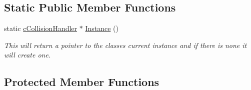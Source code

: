 \subsection*{Static Public Member Functions}
\begin{DoxyCompactItemize}
\item 
static \hyperlink{classc_collision_handler}{cCollisionHandler} $\ast$ \hyperlink{classc_collision_handler_a1c4fee89d756b7c73dd877e732713f69}{Instance} ()
\begin{DoxyCompactList}\small\item\em This will return a pointer to the classes current instance and if there is none it will create one. \item\end{DoxyCompactList}\end{DoxyCompactItemize}
\subsection*{Protected Member Functions}
